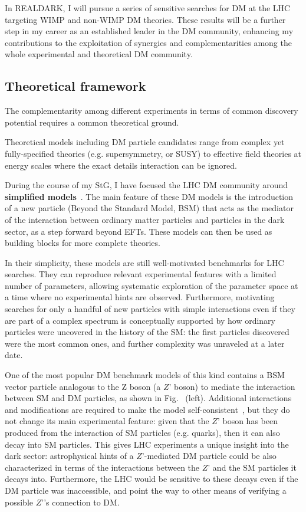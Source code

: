 In REALDARK, I will pursue a series of sensitive searches for DM at the LHC targeting WIMP and non-WIMP DM theories. These results will be a further step in my career as an established leader in the DM community, enhancing my contributions to the exploitation of synergies and complementarities among the whole experimental and theoretical DM community. 

\subsection{Theoretical framework}
\smallskip

The complementarity among different experiments in terms of common discovery potential requires a common theoretical ground. 

Theoretical models including DM particle candidates range from complex yet fully-specified theories (e.g. supersymmetry, or SUSY) to effective field theories at energy scales where the exact details interaction can be ignored. 

During the course of my StG, I have focused the LHC DM community around \textbf{simplified models}~\cite{DMWG}.
The main feature of these DM models is the introduction of a new particle (Beyond the Standard Model, BSM) that acts as the mediator of the interaction between ordinary matter particles and particles in the dark sector, as a step forward beyond EFTs. These models can then be used as building blocks for more complete theories. 

In their simplicity, these models are still well-motivated benchmarks for LHC searches. They can reproduce relevant experimental features with a limited number of parameters, allowing systematic exploration of the parameter space at a time where no experimental hints are observed. 
Furthermore, motivating searches for only a handful of new particles with simple interactions even if they are part of a complex spectrum is conceptually supported by how ordinary particles were uncovered in the history of the SM: the first particles discovered were the most common ones, and further complexity was unraveled at a later date. 

One of the most popular DM benchmark models of this kind contains a BSM vector particle analogous to the Z boson (a $Z’$ boson) to mediate the interaction between SM and DM particles, as shown in Fig.~\cite{fig:SimplifiedModels} (left). Additional interactions and modifications are required to make the model self-consistent~\cite{AnomalyFreeModels}, but they do not change its main experimental feature: given that the $Z’$ boson has been produced from the interaction of SM particles (e.g. quarks), then it can also decay into SM particles. 
This gives LHC experiments a unique insight into the dark sector: astrophysical hints of a $Z’$-mediated DM particle could be also characterized in terms of the interactions between the $Z’$ and the SM particles it decays into. Furthermore, the LHC would be sensitive to these decays even if the DM particle was inaccessible, and point the way to other means of verifying a possible $Z’$’s connection to DM. 

